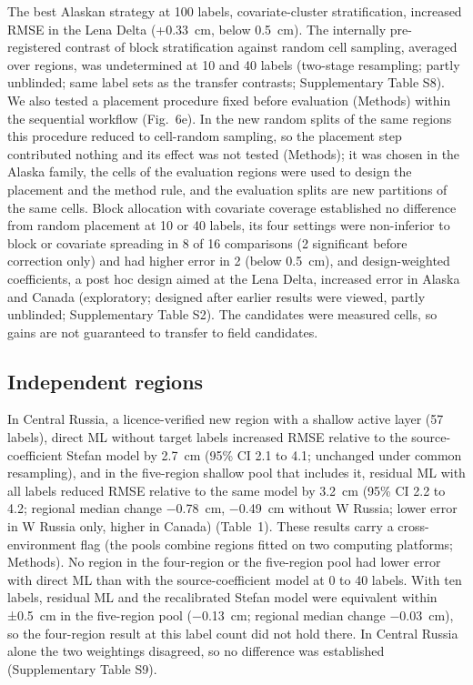 The best Alaskan strategy at 100 labels, covariate-cluster stratification, increased RMSE in the Lena Delta (+0.33~cm, below 0.5~cm).
The internally pre-registered contrast of block stratification against random cell sampling, averaged over regions, was undetermined at 10 and 40 labels (two-stage resampling; partly unblinded; same label sets as the transfer contrasts; Supplementary Table S8).
We also tested a placement procedure fixed before evaluation (Methods) within the sequential workflow (Fig.~6e).
In the new random splits of the same regions this procedure reduced to cell-random sampling, so the placement step contributed nothing and its effect was not tested (Methods); it was chosen in the Alaska family, the cells of the evaluation regions were used to design the placement and the method rule, and the evaluation splits are new partitions of the same cells.
Block allocation with covariate coverage established no difference from random placement at 10 or 40 labels, its four settings were non-inferior to block or covariate spreading in 8 of 16 comparisons (2 significant before correction only) and had higher error in 2 (below 0.5~cm), and design-weighted coefficients, a post hoc design aimed at the Lena Delta, increased error in Alaska and Canada (exploratory; designed after earlier results were viewed, partly unblinded; Supplementary Table S2).
The candidates were measured cells, so gains are not guaranteed to transfer to field candidates.

\subsection{Independent regions}
\label{sec:results-independent}

In Central Russia, a licence-verified new region with a shallow active layer (57 labels), direct ML without target labels increased RMSE relative to the source-coefficient Stefan model by 2.7~cm (95\% CI 2.1 to 4.1; unchanged under common resampling), and in the five-region shallow pool that includes it, residual ML with all labels reduced RMSE relative to the same model by 3.2~cm (95\% CI 2.2 to 4.2; regional median change −0.78~cm, −0.49~cm without W Russia; lower error in W Russia only, higher in Canada) (Table~1).
These results carry a cross-environment flag (the pools combine regions fitted on two computing platforms; Methods).
No region in the four-region or the five-region pool had lower error with direct ML than with the source-coefficient model at 0 to 40 labels.
With ten labels, residual ML and the recalibrated Stefan model were equivalent within ±0.5~cm in the five-region pool (−0.13~cm; regional median change −0.03~cm), so the four-region result at this label count did not hold there.
In Central Russia alone the two weightings disagreed, so no difference was established (Supplementary Table S9).

